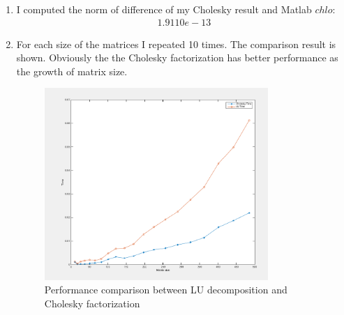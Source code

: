 \documentclass{article}
\begin{document}
\begin{enumerate}
\item 
I computed the norm of difference of my Cholesky result and Matlab $chlo$: \\
\begin{align*}   1.9110e-13   \end{align*} 


\item 
For each size of the matrices I repeated 10 times. The comparison result is shown.   Obviously the the Cholesky factorization has better performance as the growth of matrix size. 
\begin{figure} 
\centering 
\includegraphics[width=0.8\textwidth]{luVScholesky}
\caption{Performance comparison between LU decomposition and Cholesky factorization}
\end{figure}


\end{enumerate}
\end{document}
